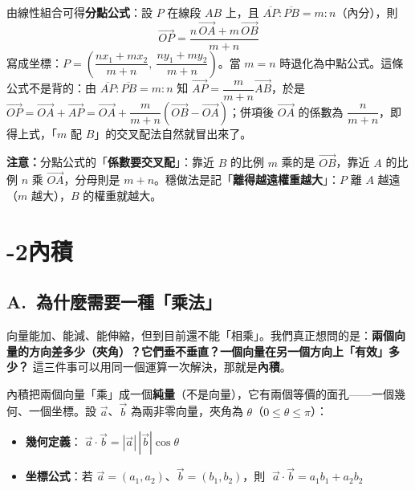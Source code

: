 \documentclass[11pt]{article}
\begin{document}
由線性組合可得\textbf{分點公式}：設 $P$ 在線段 $AB$ 上，且 $\overline{AP}:\overline{PB}=m:n$（內分），則
$$\boxed{\;\overrightarrow{OP}=\frac{n\,\overrightarrow{OA}+m\,\overrightarrow{OB}}{m+n}\;}$$
寫成坐標：$P=\left(\dfrac{n x_1+m x_2}{m+n},\ \dfrac{n y_1+m y_2}{m+n}\right)$。當 $m=n$ 時退化為中點公式。這條公式不是背的：由 $\overline{AP}:\overline{PB}=m:n$ 知 $\overrightarrow{AP}=\dfrac{m}{m+n}\overrightarrow{AB}$，於是 $\overrightarrow{OP}=\overrightarrow{OA}+\overrightarrow{AP}=\overrightarrow{OA}+\dfrac{m}{m+n}(\overrightarrow{OB}-\overrightarrow{OA})$；併項後 $\overrightarrow{OA}$ 的係數為 $\dfrac{n}{m+n}$，即得上式，「$m$ 配 $B$」的交叉配法自然就冒出來了。

\textbf{注意：}分點公式的「\textbf{係數要交叉配}」：靠近 $B$ 的比例 $m$ 乘的是 $\overrightarrow{OB}$，靠近 $A$ 的比例 $n$ 乘 $\overrightarrow{OA}$，分母則是 $m+n$。穩做法是記「\textbf{離得越遠權重越大}」：$P$ 離 $A$ 越遠（$m$ 越大），$B$ 的權重就越大。


\section*{-2\quad 內積}

\subsection*{\sffamily A.\ 為什麼需要一種「乘法」}

向量能加、能減、能伸縮，但到目前還不能「相乘」。我們真正想問的是：\textbf{兩個向量的方向差多少（夾角）？它們垂不垂直？一個向量在另一個方向上「有效」多少？} 這三件事可以用同一個運算一次解決，那就是\textbf{內積}。

內積把兩個向量「乘」成一個\textbf{純量}（不是向量），它有兩個等價的面孔——一個幾何、一個坐標。設 $\vec a$、$\vec b$ 為兩非零向量，夾角為 $\theta$（$0\le\theta\le\pi$）：

\begin{itemize}\setlength{\itemsep}{2pt}
\item \textbf{幾何定義}：$\displaystyle\boxed{\;\vec a\cdot\vec b=|\vec a|\,|\vec b|\cos\theta\;}$
\item \textbf{坐標公式}：若 $\vec a=(a_1,a_2)$、$\vec b=(b_1,b_2)$，則 $\displaystyle\boxed{\;\vec a\cdot\vec b=a_1 b_1+a_2 b_2\;}$
\end{itemize}
\end{document}
